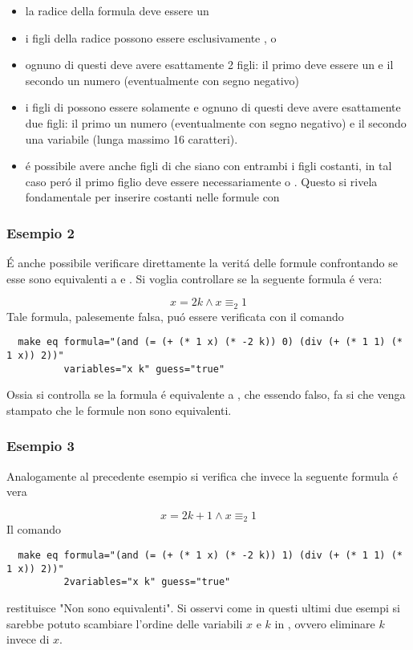 \documentclass[11pt,letterpaper,twoside]{article}
\begin{document}
\begin{itemize}
\item la radice della formula deve essere un 
\item i figli della radice possono essere esclusivamente \inline{>}, \inline{=} o 
\item ognuno di questi deve avere esattamente 2 figli: il primo deve essere un \inline{+} e
  il secondo un numero (eventualmente con segno negativo)
\item i figli di \inline{+} possono essere solamente \inline{*} e ognuno di questi deve avere
  esattamente due figli: il primo un numero (eventualmente con segno negativo) e il secondo una
  variabile (lunga massimo 16 caratteri).
\item \'e possibile avere anche figli di \inline{+} che siano \inline{*} con
  entrambi i figli costanti, in tal caso per\'o il primo figlio deve essere
  necessariamente  o . Questo si rivela fondamentale per inserire
  costanti nelle formule con 
\end{itemize}

\subsubsection{Esempio 2}
\'E anche possibile verificare direttamente la verit\'a delle formule
confrontando se esse sono equivalenti a  e .
Si voglia controllare se la seguente formula \'e vera:

$$ x = 2k \land x \equiv_2 1 $$
Tale formula, palesemente falsa, pu\'o essere verificata con il comando

\begin{verbatim}
  make eq formula="(and (= (+ (* 1 x) (* -2 k)) 0) (div (+ (* 1 1) (* 1 x)) 2))"
          variables="x k" guess="true"
\end{verbatim}

Ossia si controlla se la formula \'e equivalente a , che essendo
falso, fa si che venga stampato che le formule non sono equivalenti.

\subsubsection{Esempio 3}
Analogamente al precedente esempio si verifica che invece la seguente formula
\'e vera

$$ x = 2k + 1 \land x \equiv_2 1 $$
Il comando
\begin{verbatim}
  make eq formula="(and (= (+ (* 1 x) (* -2 k)) 1) (div (+ (* 1 1) (* 1 x)) 2))"
          2variables="x k" guess="true"
\end{verbatim}
restituisce "Non sono equivalenti".
Si osservi come in questi ultimi due esempi si sarebbe potuto scambiare l'ordine delle
variabili $x$ e $k$ in , ovvero eliminare $k$ invece di $x$.

\newpage
\tableofcontents

\newpage \printbibliography
\end{document}
